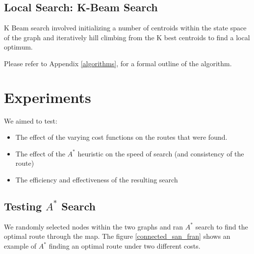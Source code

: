 \documentclass[11pt]{article}
\begin{document}
\subsection{Local Search: K-Beam Search}

K Beam search involved initializing a number of centroids within the state space of the graph and iteratively hill climbing from the K best centroids to find a local optimum.
\par
Please refer to Appendix \ref{algorithms},  for a formal outline of the algorithm.

\section{Experiments}
We aimed to test:
\begin{itemize}
\item The effect of the varying cost functions on the routes that were found.
\item The effect of the $A^{*}$ heuristic on the speed of search (and consistency of the route)
\item The efficiency and effectiveness of the resulting search
\end{itemize}

\subsection{Testing $A^{*}$ Search}
We randomly selected nodes within the two graphs and ran $A^{*}$ search to find the optimal route through the map. The figure \ref{connected_san_fran} shows an example of $A^{*}$ finding an optimal route under two different costs.
\end{document}
